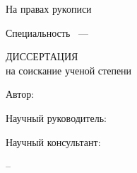 
%
%
%
%

\thispagestyle{empty}

\begin{center}
\dissorg
\par
\end{center}

\vspace{10mm}
\begin{flushright}
На правах рукописи

\end{flushright}

\vspace{20mm}
\begin{center}
{\bf \large \dissauthor}
\end{center}

\vspace{5mm}
\begin{center}
{\bf \large \disstitle
\par}

\vspace{10mm}
{%
Специальность \specnum~---

\specname
}

\vspace{10mm}
ДИССЕРТАЦИЯ \\ на соискание ученой степени \\

\edudegree
\end{center}

\vspace{5mm}
\begin{flushleft}
	Автор:
\end{flushleft}

\begin{flushright}
Научный руководитель:

\mentordegree

\mentorname
\end{flushright}

\begin{flushright}
Научный консультант:

\consultantdegree

\consultantname

\end{flushright}

\vfill
\begin{center}
{\disscity -- \dissyear}
\end{center}

